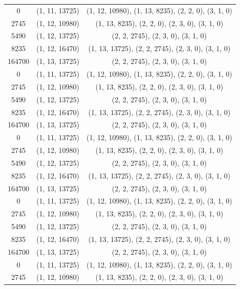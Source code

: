 \begin{center}
\begin{longtable}{ccc}
		0      & (1, 11, 13725) & (1, 12, 10980), (1, 13, 8235), (2, 2, 0), (3, 1, 0) \\
		2745   & (1, 12, 10980) & (1, 13, 8235), (2, 2, 0), (2, 3, 0), (3, 1, 0) \\
		5490   & (1, 12, 13725) & (2, 2, 2745), (2, 3, 0), (3, 1, 0) \\
		8235   & (1, 12, 16470) & (1, 13, 13725), (2, 2, 2745), (2, 3, 0), (3, 1, 0) \\
		164700 & (1, 13, 13725) & (2, 2, 2745), (2, 3, 0), (3, 1, 0) \\
		0      & (1, 11, 13725) & (1, 12, 10980), (1, 13, 8235), (2, 2, 0), (3, 1, 0) \\
		2745   & (1, 12, 10980) & (1, 13, 8235), (2, 2, 0), (2, 3, 0), (3, 1, 0) \\
		5490   & (1, 12, 13725) & (2, 2, 2745), (2, 3, 0), (3, 1, 0) \\
		8235   & (1, 12, 16470) & (1, 13, 13725), (2, 2, 2745), (2, 3, 0), (3, 1, 0) \\
		164700 & (1, 13, 13725) & (2, 2, 2745), (2, 3, 0), (3, 1, 0) \\
		0      & (1, 11, 13725) & (1, 12, 10980), (1, 13, 8235), (2, 2, 0), (3, 1, 0) \\
		2745   & (1, 12, 10980) & (1, 13, 8235), (2, 2, 0), (2, 3, 0), (3, 1, 0) \\
		5490   & (1, 12, 13725) & (2, 2, 2745), (2, 3, 0), (3, 1, 0) \\
		8235   & (1, 12, 16470) & (1, 13, 13725), (2, 2, 2745), (2, 3, 0), (3, 1, 0) \\
		164700 & (1, 13, 13725) & (2, 2, 2745), (2, 3, 0), (3, 1, 0) \\
		0      & (1, 11, 13725) & (1, 12, 10980), (1, 13, 8235), (2, 2, 0), (3, 1, 0) \\
		2745   & (1, 12, 10980) & (1, 13, 8235), (2, 2, 0), (2, 3, 0), (3, 1, 0) \\
		5490   & (1, 12, 13725) & (2, 2, 2745), (2, 3, 0), (3, 1, 0) \\
		8235   & (1, 12, 16470) & (1, 13, 13725), (2, 2, 2745), (2, 3, 0), (3, 1, 0) \\
		164700 & (1, 13, 13725) & (2, 2, 2745), (2, 3, 0), (3, 1, 0) \\
		0      & (1, 11, 13725) & (1, 12, 10980), (1, 13, 8235), (2, 2, 0), (3, 1, 0) \\
		2745   & (1, 12, 10980) & (1, 13, 8235), (2, 2, 0), (2, 3, 0), (3, 1, 0) \\

\end{longtable}
\end{center}
